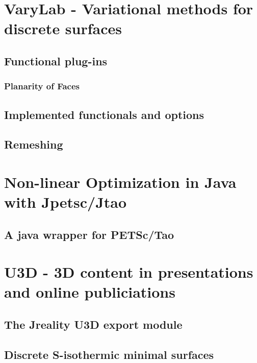 \documentclass[Thesis.tex]{subfiles}
\begin{document}
\chapter{{\sc VaryLab} - Variational methods for discrete surfaces}
\label{sec:varylab}



\section{Functional plug-ins}

\subsection{Planarity of Faces}



\section{Implemented functionals and options}
\section{Remeshing}

\chapter{Non-linear Optimization in {\sc Java} with {\sc Jpetsc/Jtao}}
\label{sec:jpetsctao}

\section{A java wrapper for {\sc PETSc/Tao}}

\chapter{{\sc U3D} - 3D content in presentations and online publiciations}
\label{sec:u3d}
\section{The {\sc Jreality} U3D export module}
\section{Discrete S-isothermic minimal surfaces}

\subfilebibliography
\end{document}
